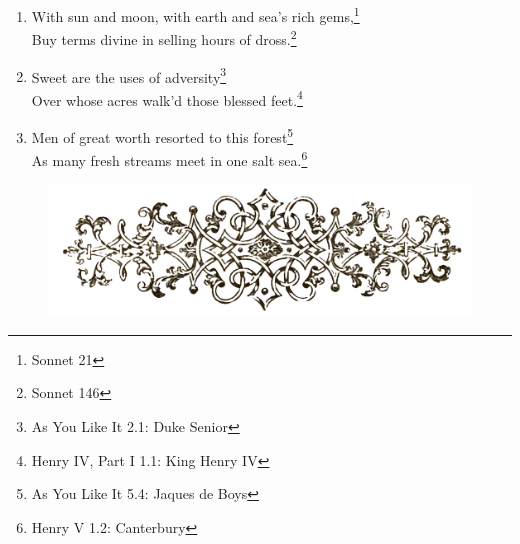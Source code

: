 \documentclass[17pt,twoside]{extarticle}
\begin{document}
\begin{enumerate}
{    IV, Part I 5.4: Prince Henry}
\item
  With sun and moon, with earth and sea's rich gems,\footnote{Sonnet 21}\\Buy
  terms divine in selling hours of dross.\footnote{Sonnet 146}
\item
  Sweet are the uses of adversity\footnote{As You Like It 2.1: Duke
    Senior}\\Over whose acres walk'd those blessed feet.\footnote{Henry
    IV, Part I 1.1: King Henry IV}
\item
  Men of great worth resorted to this forest\footnote{As You Like It
    5.4: Jaques de Boys}\\As many fresh streams meet in one salt
  sea.\footnote{Henry V 1.2: Canterbury}
\end{enumerate}

\vspace{2cm}

\begin{figure}[htbp] 
   \centering
   \includegraphics[width=15.5cm]{images/frontispiece.png}
\end{figure}
\end{document}
